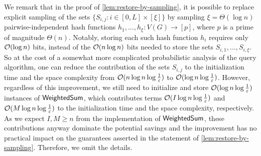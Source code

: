 
We remark that in the proof of \cref{lem:restore-by-sampling}, it is possible to replace explicit sampling of the sets $\{S_{i,j}\colon i\in [0,L]\times [\xi]\}$ by sampling $\xi=\Theta(\log n)$ pairwise-independent hash functions $h_1,\ldots,h_\xi\colon V(G)\to [p]$, where $p$ is a prime of magnitude $\Theta(n)$. Notably, storing each such hash function $h_i$ requires only $\mathcal{O}(\log n)$ bits, instead of the $\mathcal{O}(n\log n)$ bits needed to store the sets $S_{i,1},\ldots,S_{i,\xi}$. So at the cost of a somewhat more complicated probabilistic analysis of the query algorithm, one can reduce the contribution of the sets $S_{i,j}$ to the initialization time and the space complexity from $\mathcal{O}(n\log n\log \tfrac{1}{\varepsilon})$ to $\mathcal{O}(\log n\log \tfrac{1}{\varepsilon})$. However, regardless of this improvement, we still need to initialize and store $\mathcal{O}(\log n\log \tfrac{1}{\varepsilon})$ instances of $\mathsf{WeightedSum}$, which contributes terms $\mathcal{O}(I\log n\log \tfrac{1}{\varepsilon})$ and $\mathcal{O}(M\log n\log \tfrac{1}{\varepsilon})$ to the initialization time and the space complexity, respectively. As we expect $I,M\geq n$ from the implementation of $\mathsf{WeightedSum}$, these contributions anyway dominate the potential savings and the improvement has no practical impact on the guarantees asserted in the statement of  \cref{lem:restore-by-sampling}. Therefore, we omit the details.


